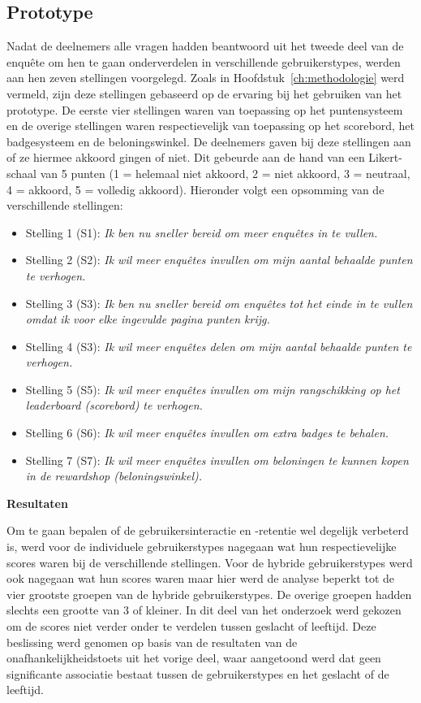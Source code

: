 \subsection{Prototype}

Nadat de deelnemers alle vragen hadden beantwoord uit het tweede deel van de enquête om hen te gaan onderverdelen in verschillende gebruikerstypes, werden aan hen zeven stellingen voorgelegd. Zoals in Hoofdstuk~\ref{ch:methodologie} werd vermeld, zijn deze stellingen gebaseerd op de ervaring bij het gebruiken van het prototype. De eerste vier stellingen waren van toepassing op het puntensysteem en de overige stellingen waren respectievelijk van toepassing op het scorebord, het badgesysteem en de beloningswinkel. De deelnemers gaven bij deze stellingen aan of ze hiermee akkoord gingen of niet. Dit gebeurde aan de hand van een Likert-schaal van 5 punten (1 = helemaal niet akkoord, 2 = niet akkoord, 3 = neutraal, 4 = akkoord, 5 = volledig akkoord). Hieronder volgt een opsomming van de verschillende stellingen:

\begin{itemize}
    \item Stelling 1 (S1): \textit{Ik ben nu sneller bereid om meer enquêtes in te vullen.}
    \item Stelling 2 (S2): \textit{Ik wil meer enquêtes invullen om mijn aantal behaalde punten te verhogen.}
    \item Stelling 3 (S3): \textit{Ik ben nu sneller bereid om enquêtes tot het einde in te vullen omdat ik voor elke ingevulde pagina punten krijg.}
    \item Stelling 4 (S3): \textit{Ik wil meer enquêtes delen om mijn aantal behaalde punten te verhogen.}
    \item Stelling 5 (S5): \textit{Ik wil meer enquêtes invullen om mijn rangschikking op het leaderboard (scorebord) te verhogen.}
    \item Stelling 6 (S6): \textit{Ik wil meer enquêtes invullen om extra badges te behalen.}
    \item Stelling 7 (S7): \textit{Ik wil meer enquêtes invullen om beloningen te kunnen kopen in de rewardshop (beloningswinkel).}
\end{itemize}

\textbf{Resultaten}

Om te gaan bepalen of de gebruikersinteractie en -retentie wel degelijk verbeterd is, werd voor de individuele gebruikerstypes nagegaan wat hun respectievelijke scores waren bij de verschillende stellingen. Voor de hybride gebruikerstypes werd ook nagegaan wat hun scores waren maar hier werd de analyse beperkt tot de vier grootste groepen van de hybride gebruikerstypes. De overige groepen hadden slechts een grootte van 3 of kleiner. In dit deel van het onderzoek werd gekozen om de scores niet verder onder te verdelen tussen geslacht of leeftijd. Deze beslissing werd genomen op basis van de resultaten van de onafhankelijkheidstoets uit het vorige deel, waar aangetoond werd dat geen significante associatie bestaat tussen de gebruikerstypes en het geslacht of de leeftijd.

